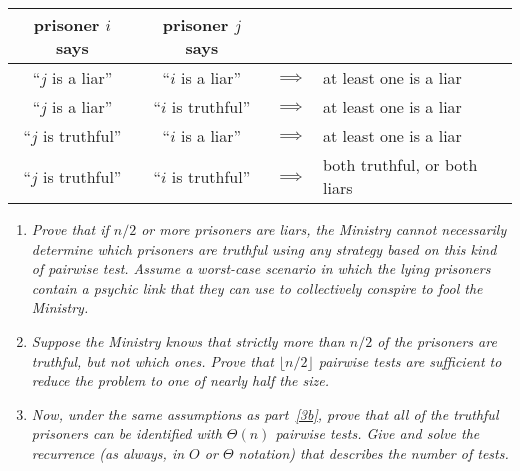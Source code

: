 \documentclass[12pt]{article}
\begin{document}
\begin{enumerate}
{	\begin{small}
	\begin{center}
	\begin{tabular}{ccll}
	prisoner $i$ says & prisoner $j$ says & &  \\
	\hline
	``$j$ is a liar'' & ``$i$ is a liar'' & $\implies$ & at least one is a liar \\
	``$j$ is a liar'' & ``$i$ is truthful'' & $\implies$ & at least one is a liar \\
	``$j$ is truthful'' & ``$i$ is a liar'' & $\implies$ & at least one is a liar \\
	``$j$ is truthful'' & ``$i$ is truthful'' & $\implies$ & both truthful, or both liars \\
	\end{tabular}
	\end{center}
	\end{small}}
	
	\begin{enumerate}
	\item {\itshape \label{3a} Prove that if $n/2$ or more prisoners are liars, the Ministry cannot necessarily determine which prisoners are truthful using \emph{any} strategy based on this kind of pairwise test. Assume a worst-case scenario in which the lying prisoners contain a psychic link that they can use to collectively conspire to fool the Ministry.}
	\pagebreak
	
	\item {\itshape \label{3b} Suppose the Ministry knows that strictly more than $n/2$ of the prisoners are truthful, but not which ones. Prove that $\lfloor n/2\rfloor$ pairwise tests are sufficient to reduce the problem to one of nearly half the size.}
	\pagebreak
	
	\item {\itshape \label{3c} Now, under the same assumptions as part~\eqref{3b}, prove that all of the truthful prisoners can be identified with $\Theta(n)$ pairwise tests. Give and solve the recurrence (as always, in $O$ or $\Theta$ notation) that describes the number of tests.}
	\pagebreak

	\end{enumerate}
	


\end{enumerate}
\end{document}
